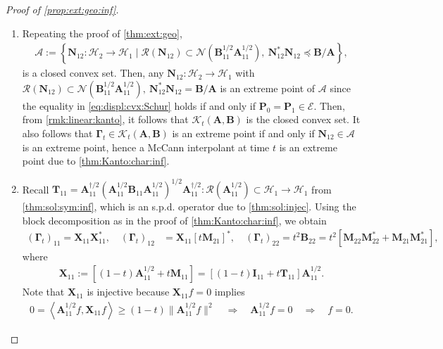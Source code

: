 \documentclass[noinfoline]{imsart}\setcounter{tocdepth}{2}
\newcommand{\m}[1]{\mathbf{#1}} %
\renewcommand{\c}[1]{\mathcal{#1}} %
\newcommand{\innpr}[2]{{\left\langle {#1},{#2}\right\rangle}} %
\theoremstyle{plain}
\begin{document}
\begin{proof}[Proof of \cref{prop:ext:geo:inf}] \quad
\begin{enumerate}[leftmargin = *]
\item Repeating the proof of \cref{thm:ext:geo},
\begin{align*}
    \c{A} := \left\{\m{N}_{12}  : \c{H}_{2} \to \c{H}_{1} \mid \c{R}(\m{N}_{12}) \subset \c{N}(\m{B}_{11}^{1/2} \m{A}_{11}^{1/2}), \ \m{N}_{12}^{*} \m{N}_{12} \preceq \m{B}/\m{A} \right\},
\end{align*}
is a closed convex set. Then, any $\m{N}_{12}  : \c{H}_{2} \to \c{H}_{1}$ with $\c{R}(\m{N}_{12}) \subset \c{N}(\m{B}_{11}^{1/2} \m{A}_{11}^{1/2}), \ \m{N}_{12}^{*} \m{N}_{12} = \m{B}/\m{A}$ is an extreme point of $\c{A}$ since the equality in \eqref{eq:displ:cvx:Schur} holds if and only if $\m{P}_{0} = \m{P}_{1} \in \c{E}$.
Then, from \cref{rmk:linear:kanto}, it follows that $\c{K}_{t}(\m{A}, \m{B})$ is the closed convex set. It also follows that $\m{\Gamma}_{t} \in \c{K}_{t}(\m{A}, \m{B})$ is an extreme point if and only if $\m{N}_{12} \in \c{A}$ is an extreme point, hence a McCann interpolant at time $t$ is an extreme point due to \cref{thm:Kanto:char:inf}.

\item Recall $\m{T}_{11} = \m{A}_{11}^{\dagger/2} (\m{A}_{11}^{1/2} \m{B}_{11} \m{A}_{11}^{1/2})^{1/2} \m{A}_{11}^{\dagger/2}: \c{R}(\m{A}_{11}^{1/2}) \subset \c{H}_{1} \rightarrow \c{H}_{1}$ from \cref{thm:sol:sym:inf}, which is an s.p.d. operator due to \cref{thm:sol:injec}. Using the block decomposition as in the proof of \cref{thm:Kanto:char:inf}, we obtain
\begin{align*}
    (\m{\Gamma}_{t})_{11} = \m{X}_{11} \m{X}_{11}^{*}, \quad
    (\m{\Gamma}_{t})_{12} &= \m{X}_{11} [t \m{M}_{21}]^{*}, \quad
    (\m{\Gamma}_{t})_{22} = t^{2} \m{B}_{22} = t^{2}[\m{M}_{22} \m{M}_{22}^{*} + \m{M}_{21} \m{M}_{21}^{*}],
\end{align*}
where
\begin{align*}
    \m{X}_{11} := [(1-t) \m{A}_{11}^{1/2} + t \m{M}_{11}] = [(1-t) \m{I}_{11} + t \m{T}_{11}] \m{A}_{11}^{1/2}. 
\end{align*}
Note that $\m{X}_{11}$ is injective because $\m{X}_{11} f = 0$ implies
\begin{align*}
    0 = \innpr{\m{A}_{11}^{1/2} f}{\m{X}_{11} f} \ge (1-t) \|\m{A}_{11}^{1/2} f \|^{2} \quad \Rightarrow \quad \m{A}_{11}^{1/2} f = 0 \quad \Rightarrow \quad f = 0.
\end{align*}


\end{enumerate}
\end{proof}
\end{document}
